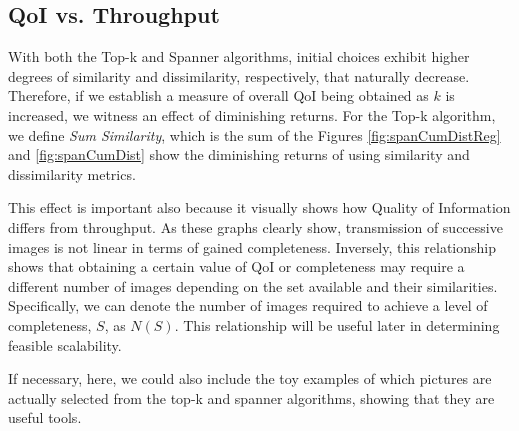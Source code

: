 \subsection{QoI vs. Throughput}

With both the Top-k and Spanner algorithms, initial choices exhibit higher degrees of similarity and dissimilarity, respectively, that naturally decrease.  Therefore, if we establish a measure of overall QoI being obtained as $k$ is increased, we witness an effect of diminishing returns.  For the Top-k algorithm, we define \emph{Sum Similarity}, which is the sum of the Figures \ref{fig:spanCumDistReg} and \ref{fig:spanCumDist} show the diminishing returns of using similarity and dissimilarity metrics.

This effect is important also because it visually shows how Quality of Information differs from throughput.  As these graphs clearly show, transmission of successive images is not linear in terms of gained completeness.  Inversely, this relationship shows that obtaining a certain value of QoI or completeness may require a different number of images depending on the set available and their similarities.  Specifically, we can denote the number of images required to achieve a level of completeness, $S$, as $N(S)$.  This relationship will be useful later in determining feasible scalability.


If necessary, here, we could also include the toy examples of which pictures are actually selected from the top-k and spanner algorithms, showing that they are useful tools.





